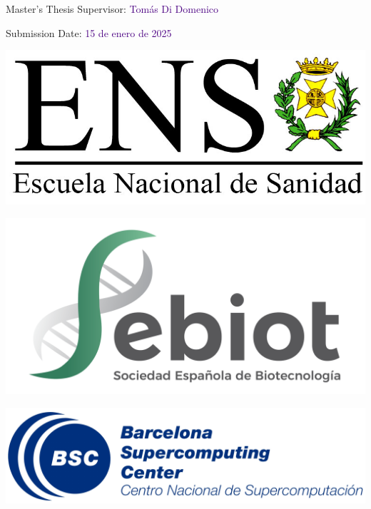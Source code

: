 \begin{titlepage}
\begin{flushleft}
        Master's Thesis Supervisor: \textcolor{indigo}{Tomás Di Domenico} 
        
        Submission Date: \textcolor{indigo}{15 de enero de 2025}
    \end{flushleft}

    \vfill

    \begin{minipage}[t]{0.20\textwidth}
        \includegraphics[width=\textwidth]{img/logo-ENS.jpg}
    \end{minipage}
    \hfill
    \begin{minipage}[t]{0.20\textwidth}
        \includegraphics[width=\textwidth]{img/sebiot_logo.png}
    \end{minipage}
    \hfill
    \begin{minipage}[t]{0.35\textwidth}
        \includegraphics[width=\textwidth]{img/biysc_bsc_logo.png}
    \end{minipage}
    \hfill
    \begin{minipage}[t]{0.17\textwidth}

\end{minipage}
\end{titlepage}

